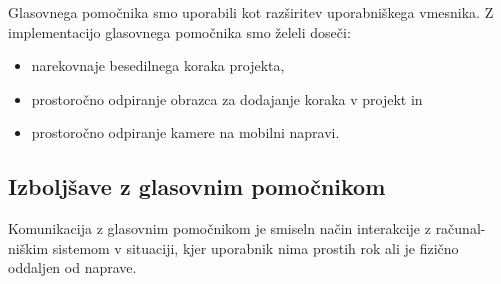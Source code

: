 \documentclass[a4paper, 12pt]{book}
\begin{document}
Glasovnega pomočnika smo uporabili kot razširitev uporabniškega vmesnika.
Z implementacijo glasovnega pomočnika smo želeli doseči:
\begin{itemize}
	\item narekovnaje besedilnega koraka projekta,
	\item prostoročno odpiranje obrazca za dodajanje koraka v projekt in
	\item prostoročno odpiranje kamere na mobilni napravi.
\end{itemize}


 
 
 





\subsection{Izboljšave z glasovnim pomočnikom}

Komunikacija z glasovnim pomočnikom je smiseln način interakcije z računal-\\niškim sistemom v situaciji, kjer uporabnik nima prostih rok ali je fizično oddaljen od naprave.

\end{document}
